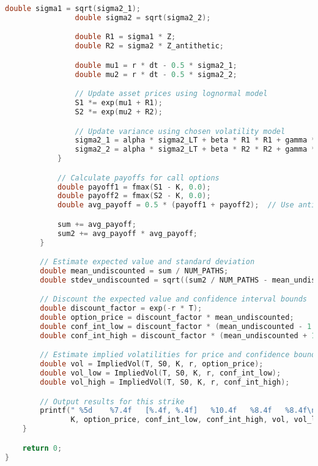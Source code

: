 \documentclass{report}
\begin{document}
\begin{lstlisting}[language=C++]
                double sigma1 = sqrt(sigma2_1);
                double sigma2 = sqrt(sigma2_2);

                double R1 = sigma1 * Z;
                double R2 = sigma2 * Z_antithetic;

                double mu1 = r * dt - 0.5 * sigma2_1;
                double mu2 = r * dt - 0.5 * sigma2_2;

                // Update asset prices using lognormal model
                S1 *= exp(mu1 + R1);
                S2 *= exp(mu2 + R2);

                // Update variance using chosen volatility model
                sigma2_1 = alpha * sigma2_LT + beta * R1 * R1 + gamma * sigma2_1;
                sigma2_2 = alpha * sigma2_LT + beta * R2 * R2 + gamma * sigma2_2;
            }

            // Calculate payoffs for call options
            double payoff1 = fmax(S1 - K, 0.0);
            double payoff2 = fmax(S2 - K, 0.0);
            double avg_payoff = 0.5 * (payoff1 + payoff2);  // Use antithetic average

            sum += avg_payoff;
            sum2 += avg_payoff * avg_payoff;
        }

        // Estimate expected value and standard deviation
        double mean_undiscounted = sum / NUM_PATHS;
        double stdev_undiscounted = sqrt((sum2 / NUM_PATHS - mean_undiscounted * mean_undiscounted) / NUM_PATHS);

        // Discount the expected value and confidence interval bounds
        double discount_factor = exp(-r * T);
        double option_price = discount_factor * mean_undiscounted;
        double conf_int_low = discount_factor * (mean_undiscounted - 1.96 * stdev_undiscounted);
        double conf_int_high = discount_factor * (mean_undiscounted + 1.96 * stdev_undiscounted);

        // Estimate implied volatilities for price and confidence bounds
        double vol = ImpliedVol(T, S0, K, r, option_price);
        double vol_low = ImpliedVol(T, S0, K, r, conf_int_low);
        double vol_high = ImpliedVol(T, S0, K, r, conf_int_high);

        // Output results for this strike
        printf(" %5d    %7.4f   [%.4f, %.4f]   %10.4f   %8.4f   %8.4f\n",
               K, option_price, conf_int_low, conf_int_high, vol, vol_low, vol_high);
    }

    return 0;
}
\end{lstlisting}


\pagebreak
\end{document}
